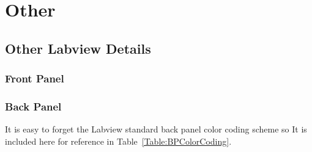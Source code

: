 
\chapter{Other}
\label{CH-Other}

\section{Other Labview Details}
\subsection{Front Panel}
\subsection{Back Panel}

It is easy to forget the Labview standard back panel color coding scheme so It is included here for reference in Table~\ref{Table:BPColorCoding}. 


